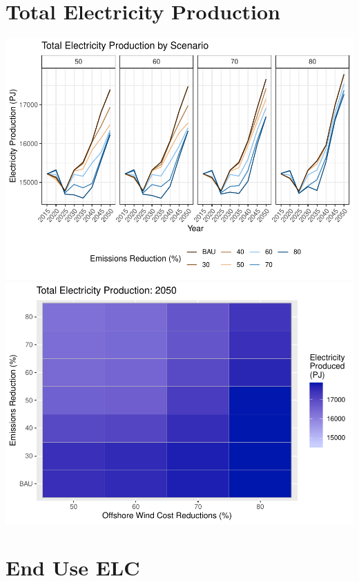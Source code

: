\documentclass[]{article}
\begin{document}
\hypertarget{total-electricity-production}{%
\section{Total Electricity
Production}\label{total-electricity-production}}

\includegraphics[width=0.5\linewidth]{osw_Report_files/figure-latex/unnamed-chunk-64-1}
\includegraphics[width=0.5\linewidth]{osw_Report_files/figure-latex/unnamed-chunk-64-2}

\hypertarget{end-use-elc}{%
\section{End Use ELC}\label{end-use-elc}}
\end{document}
